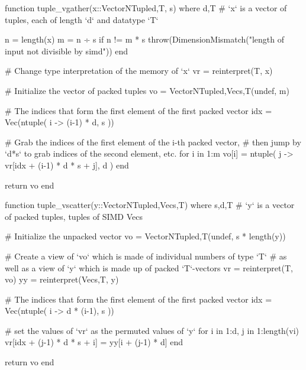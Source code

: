\begin{jllisting}[float, floatplacement=hb!, language=julia, style=jlcodestyle, label=lst:tuple_vgather, captionpos=b, caption=Conversion function to packed tuples]
    function tuple_vgather(x::Vector{NTuple{d,T}}, s) where {d,T}
        # `x` is a vector of tuples, each of length `d` and datatype `T`
    
        n = length(x)                                   
        m = n ÷ s
        if n != m * s
            throw(DimensionMismatch("length of input not divisible by simd"))
        end
    
        # Change type interpretation of the memory of `x`
        vr = reinterpret(T, x)
    
        # Initialize the vector of packed tuples
        vo = Vector{NTuple{d,Vec{s,T}}}(undef, m)
    
        # The indices that form the first element of the first packed vector
        idx = Vec(ntuple( i -> (i-1) * d, s ))
    
        # Grab the indices of the first element of the i-th packed vector, 
        # then jump by `d*s` to grab indices of the second element, etc.
        for i in 1:m
            vo[i] = ntuple( j -> vr[idx + (i-1) * d * s + j], d )
        end                                             
        
        return vo
    end
\end{jllisting}

\begin{jllisting}[float, floatplacement=hb!, language=julia, style=jlcodestyle, label=lst:tuple_vscatter, captionpos=b, caption=Conversion back to single tuples]
    function tuple_vscatter(y::Vector{NTuple{d,Vec{s,T}}}) where {s,d,T}
        # `y` is a vector of packed tuples, tuples of SIMD Vecs

        # Initialize the unpacked vector
        vo = Vector{NTuple{d,T}}(undef, s * length(y))

        # Create a view of `vo` which is made of individual numbers of type `T` 
        # as well as a view of `y` which is made up of packed `T`-vectors
        vr = reinterpret(T, vo)
        yy = reinterpret(Vec{s,T}, y)

        # The indices that form the first element of the first packed vector
        idx = Vec(ntuple( i -> d * (i-1), s ))

        # set the values of `vr` as the permuted values of `y`
        for i in 1:d, j in 1:length(vi)
            vr[idx + (j-1) * d * s + i] = yy[i + (j-1) * d]
        end

        return vo
    end
\end{jllisting}

